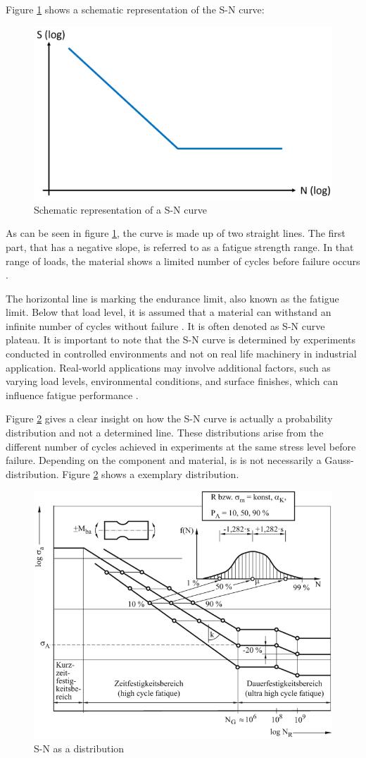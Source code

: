 Figure \ref{fig:WO} shows a schematic representation of the S-N curve: 

\begin{figure}[H]
	\centering
	\includegraphics[width=0.7\linewidth]{IMGs/WO.png}
	\caption{Schematic representation of a S-N curve}
	\label{fig:WO}
\end{figure}
\newpage
As can be seen in figure \ref{fig:WO}, the curve is made up of two straight lines. The first part, that has a negative slope, is referred to as a fatigue strength range. In that range of loads, the material shows a limited number of cycles before failure occurs \cite{Adasooriya}.

The horizontal line is marking the endurance limit, also known as the fatigue limit. Below that load level, it is assumed that a material can withstand an infinite number of cycles without failure \cite{Bellows}. It is often denoted as S-N curve plateau.
It is important to note that the S-N curve is determined by experiments conducted in controlled environments and not on real life machinery in industrial application. Real-world applications may involve additional factors, such as varying load levels, environmental conditions, and surface finishes, which can influence fatigue performance \cite{JanOveHolmen}. 

Figure \ref{fig:WO2} gives a clear insight on how the S-N curve is actually a probability distribution and not a determined line. These distributions arise from the different number of cycles achieved in experiments at the same stress level before failure. Depending on the component and material, is is not necessarily a Gauss-distribution. Figure \ref{fig:WO2} shows a exemplary distribution.
\begin{figure}[H]
	\centering
	\includegraphics[width=0.7\linewidth]{IMGs/WO2.png}
	\caption{S-N as a distribution \cite{Klein}}
	\label{fig:WO2}
\end{figure}

